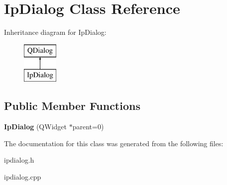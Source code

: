 \hypertarget{class_ip_dialog}{}\section{Ip\+Dialog Class Reference}
\label{class_ip_dialog}
Inheritance diagram for Ip\+Dialog\+:\begin{figure}[H]
\begin{center}
\leavevmode
\includegraphics[height=2.000000cm]{class_ip_dialog}
\end{center}
\end{figure}
\subsection*{Public Member Functions}
\begin{DoxyCompactItemize}
\item 
\hypertarget{class_ip_dialog_a3508b87201acf6954baee640045fe505}{}\label{class_ip_dialog_a3508b87201acf6954baee640045fe505} 
{\bfseries Ip\+Dialog} (Q\+Widget $\ast$parent=0)
\end{DoxyCompactItemize}


The documentation for this class was generated from the following files\+:\begin{DoxyCompactItemize}
\item 
ipdialog.\+h\item 
ipdialog.\+cpp\end{DoxyCompactItemize}

